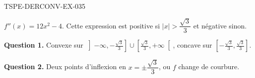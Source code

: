 \begin{corrige}{TSPE-DERCONV-EX-035}

$f''(x) = 12x^2 - 4$. Cette expression est positive si $|x| > \dfrac{\sqrt{3}}{3}$ et négative sinon.


\textbf{Question 1.} Convexe sur $\left]-\infty, -\frac{\sqrt3}{3}\right] \cup \left[\frac{\sqrt3}{3}, +\infty\right[$, concave sur $\left[-\frac{\sqrt3}{3}, \frac{\sqrt3}{3}\right]$.

\textbf{Question 2.} Deux points d'inflexion en $x = \pm\dfrac{\sqrt{3}}{3}$, ou $f$ change de courbure.

\end{corrige}
